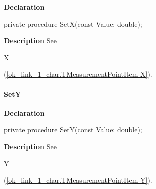 \documentclass{report}
\newif\ifpdf
\begin{document}
\label{ok_link_1_char.TMeasurementPointItem-SetX}
\begin{list}{}{
\setlength{\itemindent}{0cm}
\setlength{\listparindent}{0cm}
\setlength{\leftmargin}{\evensidemargin}
\addtolength{\leftmargin}{\tmplength}
\settowidth{\labelsep}{X}
\addtolength{\leftmargin}{\labelsep}
\setlength{\labelwidth}{\tmplength}
}
\item[\textbf{Declaration}\hfill]
\ifpdf
\begin{flushleft}
\fi
\begin{ttfamily}
private procedure SetX(const Value: double);\end{ttfamily}

\ifpdf
\end{flushleft}
\fi

\par
\item[\textbf{Description}]
See \begin{ttfamily}X\end{ttfamily}(\ref{ok_link_1_char.TMeasurementPointItem-X}).

\end{list}
\paragraph*{SetY}\hspace*{\fill}

\label{ok_link_1_char.TMeasurementPointItem-SetY}
\begin{list}{}{
\setlength{\itemindent}{0cm}
\setlength{\listparindent}{0cm}
\setlength{\leftmargin}{\evensidemargin}
\addtolength{\leftmargin}{\tmplength}
\settowidth{\labelsep}{X}
\addtolength{\leftmargin}{\labelsep}
\setlength{\labelwidth}{\tmplength}
}
\item[\textbf{Declaration}\hfill]
\ifpdf
\begin{flushleft}
\fi
\begin{ttfamily}
private procedure SetY(const Value: double);\end{ttfamily}

\ifpdf
\end{flushleft}
\fi

\par
\item[\textbf{Description}]
See \begin{ttfamily}Y\end{ttfamily}(\ref{ok_link_1_char.TMeasurementPointItem-Y}).

\end{list}
\end{document}
